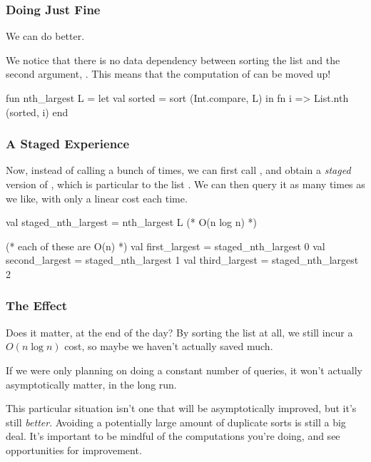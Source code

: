 \documentclass[aspectratio=169]{beamer}
\begin{document}
\begin{frame}[fragile]
  \frametitle{Doing Just Fine}

  We can do better.

  \pause
  \vspace{\fill}

  We notice that there is no data dependency between sorting the list and
  the second argument, . This means that the computation of
   can be moved up!

  \pause
  \vspace{\fill}

  \begin{codeblock}
    fun nth_largest L =
      let
        val sorted = sort (Int.compare, L)
      in
        fn i => List.nth (sorted, i)
      end
  \end{codeblock}
\end{frame}

\begin{frame}[fragile]
  \frametitle{A Staged Experience}

  Now, instead of calling  a bunch of times, we can first
  call , and obtain a \textit{staged} version of
  , which is particular to the list . We can then query
  it as many times as we like, with only a linear cost each time.

  \pause
  \vspace{\fill}

  \begin{codeblock}
    val staged_nth_largest = nth_largest L (* O(n log n) *)

    (* each of these are O(n) *)
    val first_largest = staged_nth_largest 0
    val second_largest = staged_nth_largest 1
    val third_largest = staged_nth_largest 2
  \end{codeblock}
\end{frame}

\begin{frame}[fragile]
  \frametitle{The Effect}

  Does it matter, at the end of the day? By sorting the list at all, we still
  incur a $O(n \log n)$ cost, so maybe we haven't actually saved much.

  \pause
  \vspace{\fill}

  If we were only planning on doing a constant number of queries, it won't actually
  asymptotically matter, in the long run.

  \pause
  \vspace{\fill}

  This particular situation isn't one that will be asymptotically improved, but
  it's still \textit{better}. Avoiding a potentially large amount of duplicate
  sorts is still a big deal. It's important to be mindful of the computations
  you're doing, and see opportunities for improvement.
\end{frame}
\end{document}
